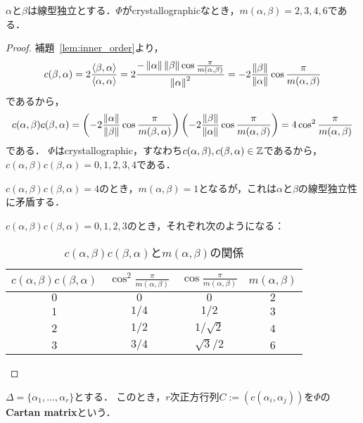 \begin{prop}
  $\alpha$と$\beta$は線型独立とする．$\Phi$がcrystallographicなとき，$m(\alpha, \beta) = 2, 3, 4, 6$である．
\end{prop}
\begin{proof}
  補題~\ref{lem:inner_order}より，
  \begin{equation}
    c(\beta, \alpha)
    = 2\frac{\left\langle \beta, \alpha \right\rangle}{\left\langle \alpha, \alpha \right\rangle}
    = 2\frac{-\left\| \alpha \right\| \left\| \beta \right\| \cos\frac{\pi}{m(\alpha, \beta)}}{\left\| \alpha \right\|^2}
    = -2\frac{\left\| \beta \right\|}{\left\| \alpha \right\|} \cos\frac{\pi}{m(\alpha, \beta)}
  \end{equation}
  であるから，
  \begin{equation}
    c(\alpha, \beta) c(\beta, \alpha)
    = \left( -2\frac{\left\| \alpha \right\|}{\left\| \beta \right\|} \cos\frac{\pi}{m(\beta, \alpha)} \right) \left( -2\frac{\left\| \beta \right\|}{\left\| \alpha \right\|} \cos\frac{\pi}{m(\alpha, \beta)} \right)
    = 4\cos^2 \frac{\pi}{m(\alpha, \beta)}
  \end{equation}
  である．
  $\Phi$はcrystallographic，すなわち$c(\alpha, \beta), c(\beta, \alpha) \in \mathbb{Z}$であるから，$c(\alpha, \beta) c(\beta, \alpha) = 0, 1, 2, 3, 4$である．

  $c(\alpha, \beta) c(\beta, \alpha) = 4$のとき，$m(\alpha, \beta) = 1$となるが，これは$\alpha$と$\beta$の線型独立性に矛盾する．

  $c(\alpha, \beta) c(\beta, \alpha) = 0, 1, 2, 3$のとき，それぞれ次のようになる：
  \begin{table}[htbp]
    \centering
    \caption{$c(\alpha, \beta) c(\beta, \alpha)$と$m(\alpha, \beta)$の関係}
    \label{fig:c_m_relation}
    \begin{tabular}{cccc}
      $c(\alpha, \beta) c(\beta, \alpha)$ & $\cos^2 \frac{\pi}{m(\alpha, \beta)}$ & $\cos\frac{\pi}{m(\alpha, \beta)}$ & $m(\alpha, \beta)$\\ \hline
      $0$ & $0$ & $0$ & $2$ \\
      $1$ & $1/4$ & $1/2$ & $3$\\
      $2$ & $1/2$ & $1/\sqrt2$ & $4$\\
      $3$ & $3/4$ & $\sqrt{3}/2$ & $6$
    \end{tabular}
  \end{table}
\end{proof}

\begin{defi}
  $\Delta = \{\alpha_1, \ldots, \alpha_r\}$とする．
  このとき，$r$次正方行列$C := (c(\alpha_i, \alpha_j))$を$\Phi$の\textbf{Cartan matrix}という．
\end{defi}

